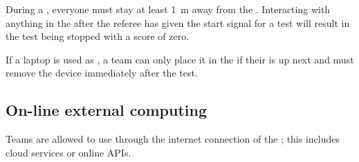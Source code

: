 During a \Testslot{}, everyone must stay at least \SI{1}{\meter} away from the \ECRA{}.
Interacting with anything in the \ECRA{} after the referee has given the start signal for a test will result in the test being stopped with a score of zero.

If a laptop is used as \ExternalComputing{}, a team can only place it in the \ECRA{} if their \Testslot{} is up next and must remove the device immediately after the test.

\subsection{On-line external computing}\label{rule:robot_external_computing_online}

Teams are allowed to use \ExternalComputing{} through the internet connection of the \ArenaNetwork{}; this includes cloud services or online APIs.
